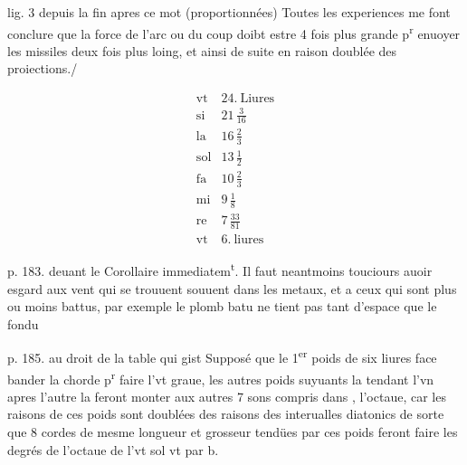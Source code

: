 \documentclass[11pt,a4paper]{article}
\begin{document}
lig. 3 depuis la fin apres ce mot (proportionnées)
Toutes les experiences me font conclure que la force de l'arc ou du coup doibt estre 4 fois plus grande p\textsuperscript{r} enuoyer les missiles deux fois plus loing, et ainsi de suite en raison doublée des proiections./


\[
\begin{array}{l|l}
\text{vt} & 24.\ \text{Liures} \\
\text{si} & 21\,\frac{3}{16} \\
\text{la} & 16\,\frac{2}{3} \\
\text{sol} & 13\,\frac{1}{2} \\
\text{fa} & 10\,\frac{2}{3} \\
\text{mi} & 9\,\frac{1}{8} \\
\text{re} & 7\,\frac{33}{81} \\
\text{vt} & 6.\ \text{liures}
\end{array}
\]

p. 183. deuant le Corollaire immediatem\textsuperscript{t}.
Il faut neantmoins touciours auoir esgard aux vent qui se trouuent souuent dans les metaux, et a ceux qui sont plus ou moins battus, par exemple le plomb batu ne tient pas tant d'espace que le fondu

p. 185. au droit de la table qui gist
Supposé que le 1\textsuperscript{er} poids de six liures face bander la chorde p\textsuperscript{r} faire l'vt graue, les autres poids suyuants la tendant l'vn apres l'autre la feront monter aux autres 7 sons compris dans , l'octaue, car les raisons de ces poids sont doublées des raisons des interualles diatonics de sorte que 8 cordes de mesme longueur et grosseur tendües par ces poids feront faire les degrés de l'octaue de l'vt sol  vt par b.
\end{document}
